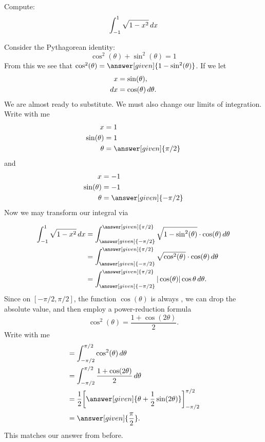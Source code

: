 \documentclass{ximera}
\begin{document}
\begin{example}
  Compute:
  \[
  \int_{-1}^1 \sqrt{1-x^2} \mathop{}\!d x
  \]
  \begin{explanation}
    Consider the Pythagorean identity:
    \[
    \cos^2(\theta) + \sin^2(\theta) = 1
    \]
    From this we see that $\cos^2(\theta)=
    \answer[given]{1-\sin^2(\theta)}$.  If we let
    \begin{align*}
      x &=\sin(\theta),\\
      \mathop{}\!d x &= \cos(\theta) \mathop{}\!d\theta.
    \end{align*}
    We are almost ready to substitute. We must also change our limits
    of integration. Write with me
    \begin{align*}
      x &= 1\\
      \sin(\theta) &= 1\\
      \theta &= \answer[given]{\pi/2}
    \end{align*}
    and
    \begin{align*}
      x &= -1\\
      \sin(\theta) &= -1\\
      \theta &= \answer[given]{-\pi/2}
    \end{align*}
    Now we may transform our integral via
    \begin{image}
    \end{image}
    \begin{align*}
      \int_{-1}^1\sqrt{1-x^2} \d x &= \int_{\answer[given]{-\pi/2}}^{\answer[given]{\pi/2}} \sqrt{1-\sin^2(\theta)} \cdot \cos(\theta) \d \theta \\
      &= \int_{\answer[given]{-\pi/2}}^{\answer[given]{\pi/2}} \sqrt{\cos^2(\theta)}\cdot \cos(\theta) \d\theta \\
      &=\int_{\answer[given]{-\pi/2}}^{\answer[given]{\pi/2}} |\cos(\theta)| \cos\theta \d\theta.
    \end{align*}
    Since on $[-\pi/2,\pi/2]$, the function $\cos(\theta)$ is always
    ,
    we can drop the absolute value, and then employ a power-reduction
    formula
    \[
    \cos^2(\theta)= \frac{1+\cos(2\theta)}{2}.
    \]
    Write with me
    \begin{align*}
      &= \int_{-\pi/2}^{\pi/2} \cos^2(\theta) \d \theta \\
      &= \int_{-\pi/2}^{\pi/2} \frac{1+\cos(2\theta)}{2} \d \theta\\
      &= \frac{1}{2} \eval{\answer[given]{\theta +\frac{1}{2}\sin(2\theta)}}_{-\pi/2}^{\pi/2}\\
      &=\answer[given]{\frac{\pi}{2}}.
    \end{align*}
    This matches our answer from before.
  \end{explanation}
\end{example}
\end{document}
